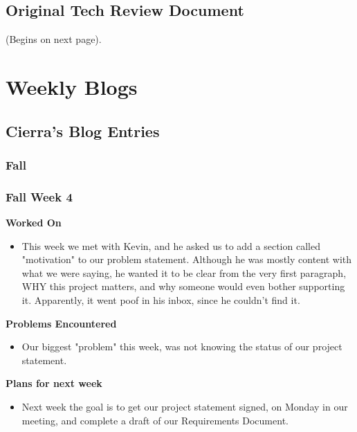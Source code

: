 \documentclass[compsoc,draftclsnofoot,onecolumn,10pt]{IEEEtran}
\begin{document}
\subsection{Original Tech Review Document}
(Begins on next page).


\clearpage
\section{Weekly Blogs}

\subsection{Cierra's Blog Entries}

\subsubsection{Fall}
\subsubsection*{Fall Week 4}
\textbf{Worked On}
\begin{itemize}
    \item This week we met with Kevin, and he asked us to add a section called "motivation" to our problem statement. Although he was mostly content with what we were saying, he wanted it to be clear from the very first paragraph, WHY this project matters, and why someone would even bother supporting it. Apparently, it went poof in his inbox, since he couldn't find it.
\end{itemize}
\textbf{Problems Encountered}
\begin{itemize}
    \item Our biggest "problem" this week, was not knowing the status of our project statement.
\end{itemize}
\textbf{Plans for next week}
\begin{itemize}
    \item Next week the goal is to get our project statement signed, on Monday in our meeting, and complete a draft of our Requirements Document.
\end{itemize}
\end{document}
